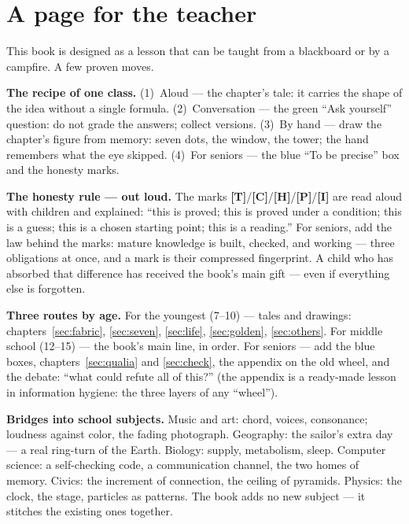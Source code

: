 \documentclass[11pt,letterpaper]{article}
\newcommand{\stT}{\textbf{[T]}\xspace}
\newcommand{\stC}{\textbf{[C]}\xspace}
\newcommand{\stP}{\textbf{[P]}\xspace}
\newcommand{\stI}{\textbf{[I]}\xspace}
\newcommand{\stH}{\textbf{[H]}\xspace}
\begin{document}
\section*{A page for the teacher}

This book is designed as a lesson that can be taught from a
blackboard or by a campfire. A few proven moves.

\textbf{The recipe of one class.} (1)~Aloud --- the chapter's tale:
it carries the shape of the idea without a single formula.
(2)~Conversation --- the green ``Ask yourself'' question: do not
grade the answers; collect versions. (3)~By hand --- draw the
chapter's figure from memory: seven dots, the window, the tower;
the hand remembers what the eye skipped. (4)~For seniors --- the
blue ``To be precise'' box and the honesty marks.

\textbf{The honesty rule --- out loud.} The marks
\stT/\stC/\stH/\stP/\stI{} are read aloud with children and
explained: ``this is proved; this is proved under a condition; this
is a guess; this is a chosen starting point; this is a reading.''
For seniors, add the law behind the marks: mature knowledge is
built, checked, and working --- three obligations at once, and a
mark is their compressed fingerprint. A
child who has absorbed that difference has received the book's main
gift --- even if everything else is forgotten.

\textbf{Three routes by age.} For the youngest (7--10) --- tales
and drawings: chapters~\ref{sec:fabric}, \ref{sec:seven},
\ref{sec:life}, \ref{sec:golden}, \ref{sec:others}. For middle
school (12--15) --- the book's main line, in order. For seniors ---
add the blue boxes, chapters~\ref{sec:qualia} and
\ref{sec:check}, the appendix on the old wheel, and the debate:
``what could refute all of this?'' (the appendix is a ready-made
lesson in information hygiene: the three layers of any ``wheel'').

\textbf{Bridges into school subjects.} Music and art: chord, voices,
consonance; loudness against color, the fading photograph.
Geography: the sailor's extra day --- a real ring-turn of the Earth.
Biology: supply, metabolism, sleep. Computer science: a
self-checking code, a communication channel, the two homes of
memory. Civics: the increment of connection, the ceiling of
pyramids. Physics: the clock, the stage, particles as patterns. The
book adds no new subject --- it stitches the existing ones
together.
\end{document}
